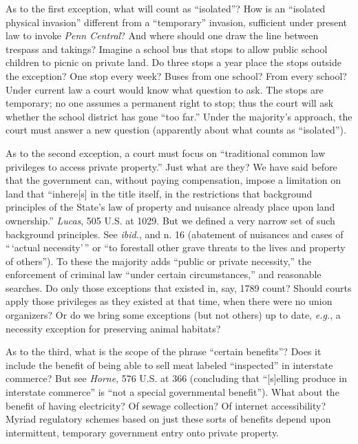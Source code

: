 As to the first exception, what will count as ``isolated''? How is an ``isolated
physical invasion'' different from a ``temporary'' invasion, sufficient under
present law to invoke \textit{Penn Central}? And where should one draw the line
between trespass and takings? Imagine a school bus that stops to allow public
school children to picnic on private land. Do three stops a year place the stops
outside the exception? One stop every week? Buses from one school? From every
school? Under current law a court would know what question to ask. The stops are
temporary; no one assumes a permanent right to stop; thus the court will ask
whether the school district has gone ``too far.'' Under the majority's approach,
the court must answer a new question (apparently about what counts as
``isolated'').


As to the second exception, a court must focus on ``traditional common law
privileges to access private property.'' Just what are they? We have said before
that the government can, without paying compensation, impose a limitation on
land that ``inhere[s] in the title itself, in the restrictions that background
principles of the State's law of property and nuisance already place upon land
ownership.'' \textit{Lucas}, 505 U.S. at 1029. But we defined a very narrow set
of such background principles. See \textit{ibid.}, and n. 16 (abatement of
nuisances and cases of ``\,`actual necessity'\,'' or ``to forestall other grave
threats to the lives and property of others''). To these the majority adds
``public or private necessity,'' the enforcement of criminal law ``under certain
circumstances,'' and reasonable searches. Do only those exceptions that existed
in, say, 1789 count? Should courts apply those privileges as they existed at
that time, when there were no union organizers? Or do we bring some exceptions
(but not others) up to date, \textit{e.g.}, a necessity exception for preserving
animal habitats?


As to the third, what is the scope of the phrase ``certain benefits''? Does it
include the benefit of being able to sell meat labeled ``inspected'' in
interstate commerce? But see \textit{Horne}, 576 U.S. at 366 (concluding that
``[s]elling produce in interstate commerce'' is ``not a special governmental
benefit''). What about the benefit of having electricity? Of sewage collection?
Of internet accessibility? Myriad regulatory schemes based on just these sorts
of benefits depend upon intermittent, temporary government entry onto private
property.


